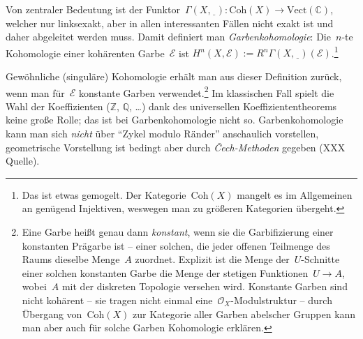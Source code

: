 \documentclass[a4paper,ngerman,12pt]{scrartcl}
\theoremstyle{definition}
\theoremstyle{plain}
\theoremstyle{remark}
\newcommand{\CC}{\mathbb{C}}
\newcommand{\ZZ}{\mathbb{Z}}
\newcommand{\QQ}{\mathbb{Q}}
\newcommand{\E}{\mathcal{E}}
\renewcommand{\O}{\mathcal{O}}
\newcommand{\Vect}{\mathrm{Vect}}
\newcommand{\Coh}{\mathrm{Coh}}
\newcommand{\placeholder}{\underline{\ \ }}
\begin{document}
Von zentraler Bedeutung ist der Funktor~$\Gamma(X,\placeholder) : \Coh(X) \to
\Vect(\CC)$, welcher nur linksexakt, aber in allen interessanten Fällen nicht
exakt ist und daher abgeleitet werden muss. Damit definiert man
\emph{Garbenkohomologie}: Die~$n$-te Kohomologie einer kohärenten Garbe~$\E$
ist $H^n(X, \E) := R^n \Gamma(X,\placeholder)(\E)$.\footnote{Das ist etwas
gemogelt. Der Kategorie~$\Coh(X)$ mangelt es im Allgemeinen an genügend
Injektiven, weswegen man zu größeren Kategorien übergeht.}

Gewöhnliche (singuläre) Kohomologie erhält man aus dieser Definition zurück,
wenn man für~$\E$ konstante Garben verwendet.\footnote{Eine Garbe heißt genau
dann \emph{konstant}, wenn sie die Garbifizierung einer konstanten Prägarbe ist
-- einer solchen, die jeder offenen Teilmenge des Raums dieselbe Menge~$A$
zuordnet. Explizit ist die Menge der~$U$-Schnitte einer solchen konstanten Garbe
die Menge der stetigen Funktionen~$U \to A$, wobei~$A$ mit der diskreten
Topologie versehen wird. Konstante Garben sind nicht kohärent -- sie tragen
nicht einmal eine~$\O_X$-Modulstruktur -- durch Übergang von~$\Coh(X)$ zur
Kategorie aller Garben abelscher Gruppen kann man aber auch für solche Garben
Kohomologie erklären.} Im klassischen Fall spielt die Wahl der Koeffizienten
($\ZZ$, $\QQ$, \ldots) dank des universellen Koeffiziententheorems keine große
Rolle; das ist bei Garbenkohomologie nicht so. Garbenkohomologie kann man sich
\emph{nicht} über "`Zykel modulo Ränder"' anschaulich vorstellen, geometrische
Vorstellung ist bedingt aber durch \emph{Čech-Methoden} gegeben (XXX Quelle).
\end{document}
